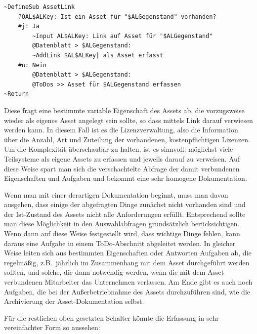 \begin{verbatim}
~DefineSub AssetLink
    ?QAL$ALKey: Ist ein Asset für "$ALGegenstand" vorhanden?
    #j: Ja
        ~Input AL$ALKey: Link auf Asset für "$ALGegenstand"
        @Datenblatt > $ALGegenstand:
        ~AddLink $AL$ALKey| als Asset erfasst
    #n: Nein
        @Datenblatt > $ALGegenstand:
        @ToDos >> Asset für $ALGegenstand erfassen
~Return
\end{verbatim}

Diese fragt eine bestimmte variable Eigenschaft des Assets ab, die vorzugsweise wieder als eigenes Asset angelegt sein sollte, so dass mittels Link darauf verwiesen werden kann. In diesem Fall ist es die Lizenzverwaltung, also die Information über die Anzahl, Art und Zuteilung der vorhandenen, kostenpflichtigen Lizenzen. Um die Komplexität überschaubar zu halten, ist es sinnvoll, möglichst viele Teilsysteme als eigene Assets zu erfassen und jeweils darauf zu verweisen. Auf diese Weise spart man sich die verschachtelte Abfrage der damit verbundenen Eigenschaften und Aufgaben und bekommt eine sehr homogene Dokumentation.

Wenn man mit einer derartigen Dokumentation beginnt, muss man davon ausgehen, dass einige der abgefragten Dinge zunächst nicht vorhanden sind und der Ist-Zustand des Assets nicht alle Anforderungen erfüllt. Entsprechend sollte man diese Möglichkeit in den Auswahlabfragen grundsätzlich berücksichtigen. Wenn dann auf diese Weise festgestellt wird, dass wichtige Dinge fehlen, kann daraus eine Aufgabe in einem ToDo-Abschnitt abgeleitet werden. In gleicher Weise leiten sich aus bestimmten Eigenschaften oder Antworten Aufgaben ab, die regelmäßig, z.B.\ jährlich im Zusammenhang mit dem Asset durchgeführt werden sollten, und solche, die dann notwendig werden, wenn die mit dem Asset verbundenen Mitarbeiter das Unternehmen verlassen. Am Ende gibt es auch noch Aufgaben, die bei der Außerbetriebnahme des Assets durchzuführen sind, wie die Archivierung der Asset-Dokumentation selbst.

Für die restlichen oben gesetzten Schalter könnte die Erfassung in sehr vereinfachter Form so aussehen:

